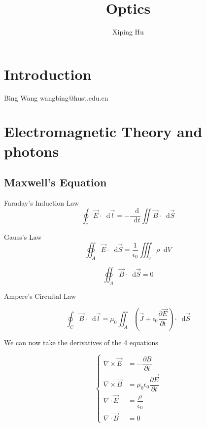 \documentclass{article}
\author{Xiping Hu}
\title{Optics}
\newcommand*{\md}{\mathop{}\!\mathrm{d}}
\begin{document}
\maketitle

\section{Introduction}

Bing Wang wangbing@hust.edu.cn

\section{Electromagnetic Theory and photons}

\subsection{Maxwell's Equation}

Faraday's Induction Law
\begin{equation}
  \oint_{c} \vec{E} \cdot \md \vec{l} = - \dfrac{\md}{\md t} \iint \vec{B} \cdot \md \vec{S}
\end{equation}

Gauss's Law
\begin{equation}
  \oiint_{A} \vec{E} \cdot \md \vec{S} = \dfrac{1}{\epsilon_{0}} \iiint_{v} \rho \md V 
\end{equation}

\begin{equation}
  \oiint_{A} \vec{B} \cdot \md \vec{S} = 0
\end{equation}

Ampere's Circuital Law

\begin{equation}
  \oint_{C} \vec{B} \cdot \md \vec{l} = \mu_{0} \iint_{A} \left( \vec{J} + \epsilon_{0} \dfrac{\partial \vec{E}}{\partial t}  \right) \cdot \md \vec{S}
\end{equation}

We can now take the derivatives of the 4 equations

\begin{equation}
  \left\{
  \begin{aligned}
    \nabla \times \vec{E} &= - \dfrac{\partial B}{\partial t} \\
    \nabla \times \vec{B} &= \mu_{0} \epsilon_{0} \dfrac{\partial \vec{E}}{\partial t}  \\
    \nabla \cdot \vec{E} &= \dfrac{\rho}{\epsilon_{0}} \\
    \nabla \cdot \vec{B} &= 0
  \end{aligned}
  \right.
\end{equation}
\end{document}
